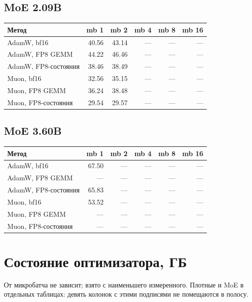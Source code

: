 \documentclass[10pt]{article}
\begin{document}
\subsection{MoE 2.09B}
\begin{center}
\small
\begin{tabular}{lrrrrr}
\toprule
\textbf{Метод} & \textbf{mb 1} & \textbf{mb 2} & \textbf{mb 4} & \textbf{mb 8} & \textbf{mb 16} \\
\midrule
AdamW, bf16 & 40.56 & 43.14 & --- & --- & --- \\
AdamW, FP8 GEMM & 44.22 & 46.46 & --- & --- & --- \\
AdamW, FP8-состояния & 38.46 & 38.49 & --- & --- & --- \\
Muon, bf16 & 32.56 & 35.15 & --- & --- & --- \\
Muon, FP8 GEMM & 36.24 & 38.48 & --- & --- & --- \\
Muon, FP8-состояния & 29.54 & 29.57 & --- & --- & --- \\
\bottomrule
\end{tabular}
\end{center}
\subsection{MoE 3.60B}
\begin{center}
\small
\begin{tabular}{lrrrrr}
\toprule
\textbf{Метод} & \textbf{mb 1} & \textbf{mb 2} & \textbf{mb 4} & \textbf{mb 8} & \textbf{mb 16} \\
\midrule
AdamW, bf16 & 67.50 & --- & --- & --- & --- \\
AdamW, FP8 GEMM & --- & --- & --- & --- & --- \\
AdamW, FP8-состояния & 65.83 & --- & --- & --- & --- \\
Muon, bf16 & 53.52 & --- & --- & --- & --- \\
Muon, FP8 GEMM & --- & --- & --- & --- & --- \\
Muon, FP8-состояния & --- & --- & --- & --- & --- \\
\bottomrule
\end{tabular}
\end{center}
\section{Состояние оптимизатора, ГБ}
От микробатча не зависит; взято с наименьшего измеренного. Плотные и MoE в отдельных таблицах: девять колонок с этими подписями не помещаются в полосу.
\end{document}
